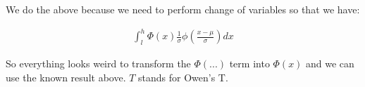 \documentclass{article}
\begin{document}
We do the above because we need to perform change of variables so that we have:

\begin{align*}
    \int^h_l \Phi(x)\frac{1}{\sigma} \phi(\frac{x - \mu}{\sigma})dx
\end{align*}

So everything looks weird to transform the $\Phi(...)$ term into $\Phi(x)$ and we 
can use the known result above. $T$ stands for Owen's T.
\end{document}
